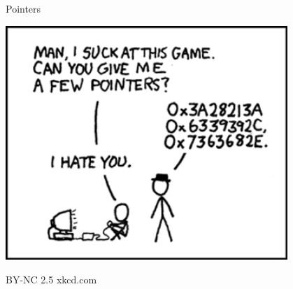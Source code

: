 \documentclass[a6paper,fontsize=10pt,twoside,open=right]{scrbook}
\begin{document}
\begin{center}
  \tiny{Pointers}\par
  \vspace{5pt}
  \includegraphics[keepaspectratio,width=0.8\textwidth]{elements/images/pointers.png}\par
  \vspace{5pt}
  \tiny{BY-NC 2.5 xkcd.com}
\end{center}
\par
\vspace{10pt}
\vfill
\newpage

\newpage

\newpage

\newpage

\newpage

\newpage

\newpage

\newpage

\newpage
\null
\vfill
{}
\vspace*{-10pt}
\end{document}
